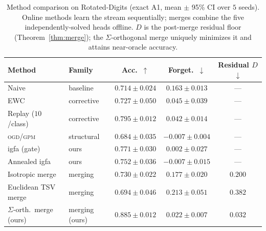 \documentclass[10pt,a4paper]{article}
\theoremstyle{plain}
\theoremstyle{definition}
\newcommand{\Sig}{\Sigma}
\newcommand{\IGFA}{igfa}
\newcommand{\OGD}{\textsc{ogd}}
\begin{document}
\begin{table}[htb]\centering\small
\caption{Method comparison on Rotated-Digits (exact A1, mean $\pm$ 95\% CI over $5$ seeds).
Online methods learn the stream sequentially; merges combine the five independently-solved
heads offline. $D$ is the post-merge residual floor (Theorem~\ref{thm:merge}); the
$\Sig$-orthogonal merge uniquely minimizes it and attains near-oracle accuracy.}
\label{tab:compare}
\begin{tabular}{llccc}
\toprule
Method & Family & Acc.\ $\uparrow$ & Forget.\ $\downarrow$ & Residual $D$ $\downarrow$ \\
\midrule
Naive                 & baseline    & $0.714\pm0.024$ & $0.163\pm0.013$ & --- \\
EWC \cite{kirkpatrick2017} & corrective & $0.727\pm0.050$ & $0.045\pm0.039$ & --- \\
Replay ($10$/class)   & corrective  & $0.795\pm0.012$ & $0.042\pm0.014$ & --- \\
\OGD{}/\textsc{gpm} \cite{farajtabar2020,saha2021} & structural & $0.684\pm0.035$ & $-0.007\pm0.004$ & --- \\
\IGFA{} (gate)        & ours        & $0.771\pm0.030$ & $0.002\pm0.027$ & --- \\
Annealed \IGFA{}      & ours        & $0.752\pm0.036$ & $-0.007\pm0.015$ & --- \\
\midrule
Isotropic merge       & merging     & $0.730\pm0.022$ & $0.177\pm0.020$ & $0.200$ \\
Euclidean TSV merge   & merging     & $0.694\pm0.046$ & $0.213\pm0.051$ & $0.382$ \\
$\Sig$-orth.\ merge (ours) & merging (ours) & $\mathbf{0.885\pm0.012}$ & $0.022\pm0.007$ & $\mathbf{0.032}$ \\
\bottomrule
\end{tabular}
\end{table}
\end{document}

